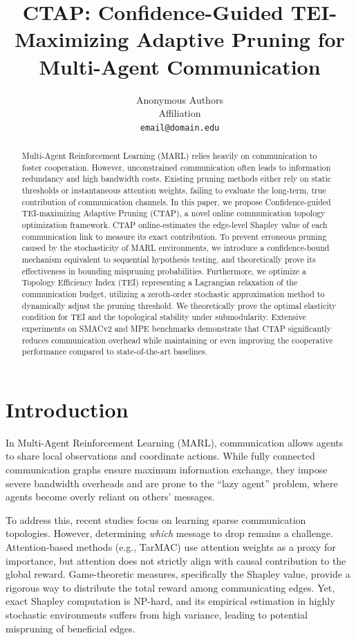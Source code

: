 \documentclass{article}
\title{CTAP: Confidence-Guided TEI-Maximizing Adaptive Pruning for Multi-Agent Communication}
\author{
  Anonymous Authors \\
  Affiliation \\
  \texttt{email@domain.edu} \\
}
\begin{document}
\maketitle

\begin{abstract}
Multi-Agent Reinforcement Learning (MARL) relies heavily on communication to foster cooperation. However, unconstrained communication often leads to information redundancy and high bandwidth costs. Existing pruning methods either rely on static thresholds or instantaneous attention weights, failing to evaluate the long-term, true contribution of communication channels. In this paper, we propose Confidence-guided TEI-maximizing Adaptive Pruning (CTAP), a novel online communication topology optimization framework. CTAP online-estimates the edge-level Shapley value of each communication link to measure its exact contribution. To prevent erroneous pruning caused by the stochasticity of MARL environments, we introduce a confidence-bound mechanism equivalent to sequential hypothesis testing, and theoretically prove its effectiveness in bounding mispruning probabilities. Furthermore, we optimize a Topology Efficiency Index (TEI) representing a Lagrangian relaxation of the communication budget, utilizing a zeroth-order stochastic approximation method to dynamically adjust the pruning threshold. We theoretically prove the optimal elasticity condition for TEI and the topological stability under submodularity. Extensive experiments on SMACv2 and MPE benchmarks demonstrate that CTAP significantly reduces communication overhead while maintaining or even improving the cooperative performance compared to state-of-the-art baselines.
\end{abstract}

\section{Introduction}
In Multi-Agent Reinforcement Learning (MARL), communication allows agents to share local observations and coordinate actions. While fully connected communication graphs ensure maximum information exchange, they impose severe bandwidth overheads and are prone to the ``lazy agent'' problem, where agents become overly reliant on others' messages. 

To address this, recent studies focus on learning sparse communication topologies. However, determining \textit{which} message to drop remains a challenge. Attention-based methods (e.g., TarMAC) use attention weights as a proxy for importance, but attention does not strictly align with causal contribution to the global reward. Game-theoretic measures, specifically the Shapley value, provide a rigorous way to distribute the total reward among communicating edges. Yet, exact Shapley computation is NP-hard, and its empirical estimation in highly stochastic environments suffers from high variance, leading to potential mispruning of beneficial edges.
\end{document}
